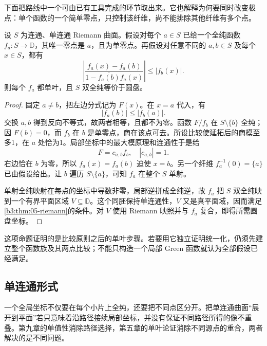 下面把路线中一个可由已有工具完成的环节取出来。它也解释为何要同时改变极点：单个函数的一个简单零点，只控制该纤维，尚不能排除其他纤维有多个点。

\begin{proposition}[由两点比较取得单叶性]\label{b3:prop:12-green-family-injective}
设 \(S\) 为连通、单连通 Riemann 曲面。假设对每个 \(a\in S\) 已给一个全纯函数 \(f_a:S\to\mathbb D\)，其唯一零点是 \(a\)，且为单零点。再假设对任意不同的 \(a,b\in S\) 及每个 \(x\in S\)，都有
\[
 \left|
 \frac{f_a(x)-f_a(b)}{1-\overline{f_a(b)}f_a(x)}
 \right|\le |f_b(x)|.
\]
则每个 \(f_a\) 都单叶，且 \(S\) 双全纯等价于圆盘。
\end{proposition}
\begin{proof}
固定 \(a\ne b\)，把左边分式记为 \(F(x)\)。在 \(x=a\) 代入，有
\[
 |f_a(b)|\le |f_b(a)|.
\]
交换 \(a,b\) 得到反向不等式，故两者相等，且都不为零。函数 \(F/f_b\) 在 \(S\setminus\{b\}\) 全纯；因 \(F(b)=0\)，而 \(f_b\) 在 \(b\) 是单零点，商在该点可去。所设比较使延拓后的商模至多1，在 \(a\) 处恰为1。局部坐标中的最大模原理和连通性于是给
\[
 F=c_{a,b}f_b,\quad |c_{a,b}|=1.
\]
右边恰在 \(b\) 为零，所以 \(f_a(x)=f_a(b)\) 迫使 \(x=b\)。另一个纤维 \(f_a^{-1}(0)=\{a\}\) 已由假设给出。让 \(b\) 遍历 \(S\setminus\{a\}\)，可知 \(f_a\) 在整个 \(S\) 单射。

单射全纯映射在每点的坐标中导数非零，局部逆拼成全纯逆，故 \(f_a\) 把 \(S\) 双全纯映到一个有界平面区域 \(V\subseteq\mathbb D\)。这个同胚保持单连通性，\(V\) 又是真平面域，因而满足\cref{b3:thm:05-riemann}的条件。对 \(V\) 使用 Riemann 映照并与 \(f_a\) 复合，即得所需圆盘坐标。
\end{proof}
这项命题证明的是比较原则之后的单叶步骤。若要用它独立证明统一化，仍须先建立整个函数族及其两点比较；不能只构造一个局部 Green 函数就认为全部假设已经满足。

\subsection{单连通形式}
\label{b3:subsec:120202}

一个全局坐标不仅要在每个小片上全纯，还要把不同点区分开。把单连通曲面“展开到平面”若只意味着沿路径接续局部坐标，并没有保证不同路径所得的像不重叠。第九章的单值性消除路径选择，第五章的单叶论证消除不同源点的重合，两者解决的是不同问题。

